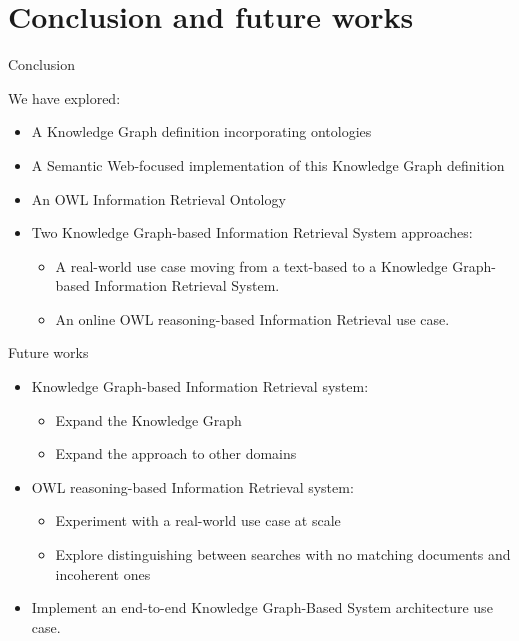 \section{Conclusion and future works}

\begin{frame}{Conclusion}

    We have explored:
    \begin{itemize}
        \item A Knowledge Graph definition incorporating ontologies
        \item A Semantic Web-focused implementation of this Knowledge Graph definition
        \item An OWL Information Retrieval Ontology
        \item Two Knowledge Graph-based Information Retrieval System approaches:
        \begin{itemize}
            \item A real-world use case moving from a text-based to a Knowledge Graph-based Information Retrieval System.
            \item An online OWL reasoning-based Information Retrieval use case.
        \end{itemize}
    \end{itemize}

\end{frame}

\begin{frame}{Future works}

    \begin{itemize}
        \item Knowledge Graph-based Information Retrieval system:
        \begin{itemize}
            \item Expand the Knowledge Graph
            \item Expand the approach to other domains
        \end{itemize}
        \item OWL reasoning-based Information Retrieval system:
        \begin{itemize}
            \item Experiment with a real-world use case at scale
            \item Explore distinguishing between searches with no matching documents and incoherent ones 
        \end{itemize}
        \item Implement an end-to-end Knowledge Graph-Based System architecture use case.
    \end{itemize}

\end{frame}

